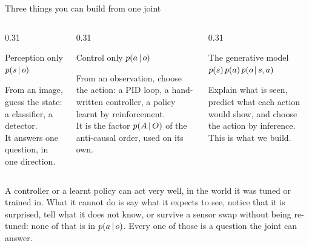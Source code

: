 \documentclass[10pt, aspectratio=169]{beamer}
\begin{document}
\begin{frame}{Three things you can build from one joint}
  \begin{columns}[T]
    \begin{column}{0.31\textwidth}
      \begin{block}{Perception only}
        \centering $p(s\,|\, o)$\\[0.3em]
        \raggedright\small From an image, guess the state: a classifier, a detector.\\[0.3em]
        It answers one question, in one direction.
      \end{block}
    \end{column}
    \begin{column}{0.31\textwidth}
      \begin{block}{Control only}
        \centering $p(a\,|\, o)$\\[0.3em]
        \raggedright\small From an observation, choose the action: a PID loop, a hand-written
        controller, a policy learnt by reinforcement.\\[0.3em]
        It is the factor $p(A\,|\, O)$ of the anti-causal order, used on its own.
      \end{block}
    \end{column}
    \begin{column}{0.31\textwidth}
      \begin{exampleblock}{The generative model}
        \centering $p(s)\,p(a)\,p(o\,|\, s, a)$\\[0.3em]
        \raggedright\small Explain what is seen, predict what each action would show, and
        choose the action by inference.\\[0.3em]
        This is what we build.
      \end{exampleblock}
    \end{column}
  \end{columns}
  \vspace{0.6em}
  \small
  A controller or a learnt policy can act very well, in the world it was tuned or trained in.
  What it cannot do is say what it expects to see, notice that it is surprised, tell what it does
  not know, or survive a sensor swap without being re-tuned: none of that is in $p(a\,|\, o)$.
  \alert{Every one of those is a question the joint can answer.}
\end{frame}
\end{document}
